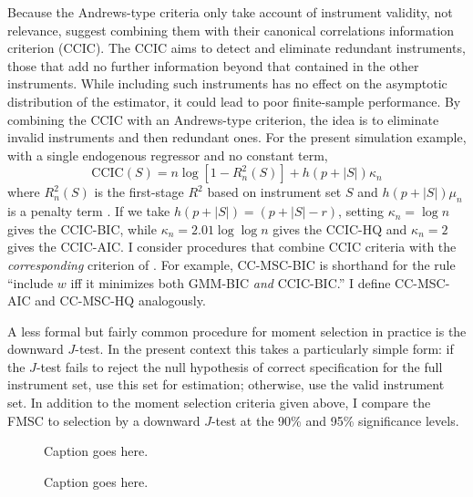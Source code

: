 Because the Andrews-type criteria only take account of instrument validity, not relevance, \cite{HallPeixe2003} suggest combining them with their canonical correlations information criterion (CCIC). 
The CCIC aims to detect and eliminate redundant instruments, those that add no further information beyond that contained in the other instruments. 
While including such instruments has no effect on the asymptotic distribution of the estimator, it could lead to poor finite-sample performance. 
By combining the CCIC with an Andrews-type criterion, the idea is to eliminate invalid instruments and then redundant ones. 
For the present simulation example, with a single endogenous regressor and no constant term, 
	\begin{equation}
	\mbox{CCIC}(S) = n \log\left[1 - R_n^2(S) \right] + h(p + |S|)\kappa_n
	\end{equation}
where $R_n^2(S)$ is the first-stage $R^2$ based on instrument set $S$ and $h(p + |S|)\mu_n$ is a penalty term \citep{Jana2005}. 
If we take $h(p + |S|) = (p + |S| - r)$, setting $\kappa_n = \log{n}$ gives the CCIC-BIC, while $\kappa_n = 2.01 \log{\log{n}}$ gives the CCIC-HQ  and $\kappa_n = 2$ gives the CCIC-AIC. 
I consider procedures that combine CCIC criteria with the \emph{corresponding} criterion of \cite{Andrews1999}. 
For example, CC-MSC-BIC is shorthand for the rule ``include $w$ iff it minimizes both  GMM-BIC \emph{and} CCIC-BIC.'' 
I define CC-MSC-AIC and CC-MSC-HQ analogously.

A less formal but fairly common procedure for moment selection in practice is the downward $J$-test. 
In the present context this takes a particularly simple form: if the $J$-test fails to reject the null hypothesis of correct specification for the full instrument set, use this set for estimation; otherwise, use the valid instrument set. 
In addition to the moment selection criteria given above, I compare the FMSC to selection by a downward $J$-test at the 90\% and 95\% significance levels. 

\begin{figure}
\centering
	
	\caption{Caption goes here.}
\end{figure}

\begin{figure}
\centering
	
	\caption{Caption goes here.}
\end{figure}

